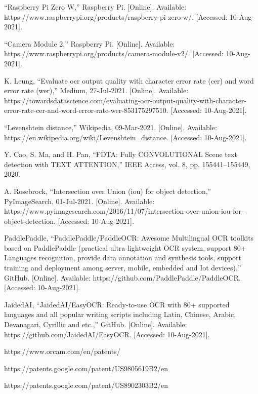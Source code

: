 \documentclass[a4paper,11pt]{article}
\begin{document}
\begin{thebibliography}{9}
“Raspberry Pi Zero W,” Raspberry Pi. [Online]. Available: https://www.raspberrypi.org/products/raspberry-pi-zero-w/. [Accessed: 10-Aug-2021]. 

“Camera Module 2,” Raspberry Pi. [Online]. Available: https://www.raspberrypi.org/products/camera-module-v2/. [Accessed: 10-Aug-2021]. 

K. Leung, “Evaluate ocr output quality with character error rate (cer) and word error rate (wer),” Medium, 27-Jul-2021. [Online]. Available: https://towardsdatascience.com/evaluating-ocr-output-quality-with-character-error-rate-cer-and-word-error-rate-wer-853175297510. [Accessed: 10-Aug-2021].

“Levenshtein distance,” Wikipedia, 09-Mar-2021. [Online]. Available: https://en.wikipedia.org/wiki/Levenshtein\_distance. [Accessed: 10-Aug-2021].

Y. Cao, S. Ma, and H. Pan, “FDTA: Fully CONVOLUTIONAL Scene text detection with TEXT ATTENTION,” IEEE Access, vol. 8, pp. 155441–155449, 2020.

A. Rosebrock, “Intersection over Union (iou) for object detection,” PyImageSearch, 01-Jul-2021. [Online]. Available: https://www.pyimagesearch.com/2016/11/07/intersection-over-union-iou-for-object-detection. [Accessed: 10-Aug-2021].

PaddlePaddle, “PaddlePaddle/PaddleOCR: Awesome Multilingual OCR toolkits based on PaddlePaddle (practical ultra lightweight OCR system, support 80+ Languages recognition, provide data annotation and synthesis tools, support training and deployment among server, mobile, embedded and Iot devices),” GitHub. [Online]. Available: https://github.com/PaddlePaddle/PaddleOCR. [Accessed: 10-Aug-2021].

JaidedAI, “JaidedAI/EasyOCR: Ready-to-use OCR with 80+ supported languages and all popular writing scripts including Latin, Chinese, Arabic, Devanagari, Cyrillic and etc.,” GitHub. [Online]. Available: https://github.com/JaidedAI/EasyOCR. [Accessed: 10-Aug-2021].

https://www.orcam.com/en/patents/

https://patents.google.com/patent/US9805619B2/en

https://patents.google.com/patent/US8902303B2/en


\end{thebibliography}
\end{document}
